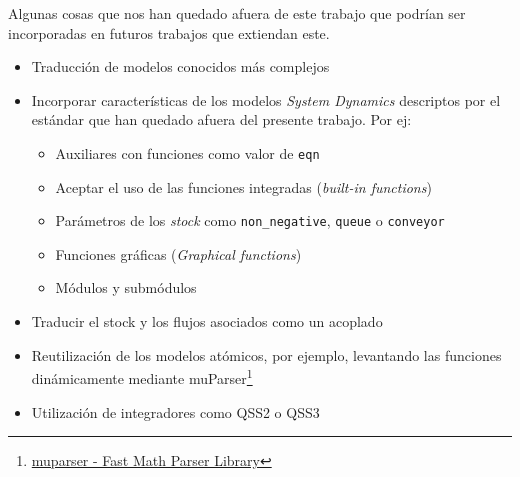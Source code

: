 Algunas cosas que nos han quedado afuera de este trabajo que podrían ser incorporadas en futuros trabajos que extiendan este.

\begin{itemize}
	\item Traducción de modelos conocidos más complejos
	\item Incorporar características de los modelos \textit{System Dynamics} descriptos por el estándar que han quedado afuera del presente trabajo. Por ej:
	\begin{itemize}
		\item Auxiliares con funciones como valor de \texttt{eqn}
		\item Aceptar el uso de las funciones integradas (\textit{built-in functions})
		\item Parámetros de los \textit{stock} como \texttt{non\_negative}, \texttt{queue} o \texttt{conveyor}
		\item Funciones gráficas (\textit{Graphical functions}) 
		\item Módulos y submódulos
	\end{itemize}
	\item Traducir el stock y los flujos asociados como un acoplado
	\item Reutilización de los modelos atómicos, por ejemplo, levantando las funciones dinámicamente mediante muParser\footnote{\href{http://beltoforion.de/article.php?a=muparser}{muparser - Fast Math Parser Library}} 
	\item Utilización de integradores como QSS2 o QSS3
\end{itemize}